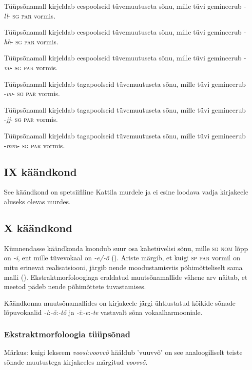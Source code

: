 \documentclass[12pt,a4paper]{article}
\newcommand{\vadja}[1]{\textit{#1}}
\newcommand{\msd}[1]{\textsc{#1}}
\begin{document}
Tüüpsõna\-mall kirjeldab eespoolseid tüvemuutuseta sõnu, mille tüvi gemineerub -\textit{ll}- \msd{sg par} vormis.

Tüüpsõna\-mall kirjeldab eespoolseid tüvemuutuseta sõnu, mille tüvi gemineerub -\textit{hh}- \msd{sg par} vormis.

Tüüpsõna\-mall kirjeldab eespoolseid tüvemuutuseta sõnu, mille tüvi gemineerub -\textit{vv}- \msd{sg par} vormis.

Tüüpsõna\-mall kirjeldab tagapoolseid tüvemuutuseta sõnu, mille tüvi gemineerub -\textit{vv}- \msd{sg par} vormis.

Tüüpsõna\-mall kirjeldab tagapoolseid tüvemuutuseta sõnu, mille tüvi gemineerub -\textit{jj}- \msd{sg par} vormis.

Tüüpsõna\-mall kirjeldab tagapoolseid tüvemuutuseta sõnu, mille tüvi gemineerub -\textit{mm}- \msd{sg par} vormis.



\subsection{\RN{9} käändkond}
See käändkond on spetsiifiline Kattila murdele ja ei esine loodava vadja kirjakeele aluseks olevas murdes.


\subsection{\RN{10} käändkond}

Kümnendasse käändkonda koondub suur osa kahetüvelisi sõnu, mille \msd{sg nom} lõpp on \vadja{-i}, ent mille tüvevokaal on \vadja{-e/-õ} (\cite[47]{ariste_grammar_1968}). Ariste märgib, et kuigi \msd{sp par} vormil on mitu erinevat realisatsiooni, järgib nende moodustamis\-viis põhimõtteliselt sama malli (\cite[47]{ariste_grammar_1968}). Ekstrakt\-morfoloogiaga eraldatud muutsõnamallide vähene arv näitab, et meetod pädeb nende põhimõttete tuvastamises.

Käändkonna muutsõnamallides on kirjakeele järgi ühtlustatud kõikide sõnade lõpuvokaalid \textit{-i}:\textit{-õ}:\textit{-tõ} ja \textit{-i}:\textit{-e}:\textit{-te} vastavalt sõna vokaalharmooniale.

\subsubsection*{Ekstraktmorfoloogia tüüpsõnad}
\vspace{-3.5em}






Märkus: kuigi lekseem \textit{voosi}:\textit{voovvõ} hääldub 'vuuvvõ' on see analoogiliselt teiste sõnade muutustega kirjakeeles märgitud \textit{voovvõ}.






\end{document}

